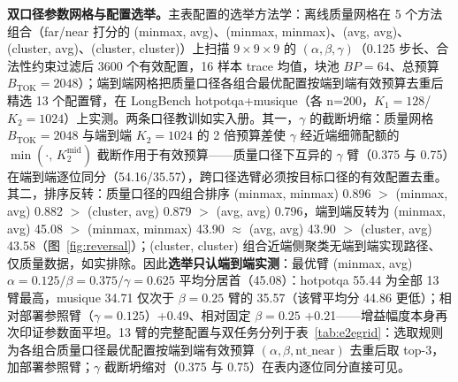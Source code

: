 \documentclass[11pt]{article}
\begin{document}
\textbf{双口径参数网格与配置选举。}主表配置的选举方法学：离线质量网格在 5 个方法组合（far/near 打分的 (minmax, avg)、(minmax, minmax)、(avg, avg)、(cluster, avg)、(cluster, cluster)）上扫描 $9\times9\times9$ 的 $(\alpha,\beta,\gamma)$（0.125 步长、合法性约束过滤后 3600 个有效配置，16 样本 trace 均值，块池 $BP{=}64$、总预算 $B_{\mathrm{TOK}}{=}2048$）；端到端网格把质量口径各组合最优配置按端到端有效预算去重后精选 13 个配置臂，在 LongBench hotpotqa+musique（各 n=200，$K_1{=}128$/$K_2{=}1024$）上实测。两条口径教训如实入册。其一，$\gamma$ 的截断坍缩：质量网格 $B_{\mathrm{TOK}}{=}2048$ 与端到端 $K_2{=}1024$ 的 2 倍预算差使 $\gamma$ 经近端细筛配额的 $\min(\cdot,\,K_2^{\mathrm{mid}})$ 截断作用于有效预算——质量口径下互异的 $\gamma$ 臂（0.375 与 0.75）在端到端逐位同分（54.16/35.57），跨口径选臂必须按目标口径的有效配置去重。其二，排序反转：质量口径的四组合排序 (minmax, minmax) 0.896 $>$ (minmax, avg) 0.882 $>$ (cluster, avg) 0.879 $>$ (avg, avg) 0.796，端到端反转为 (minmax, avg) 45.08 $>$ (minmax, minmax) 43.90 $\approx$ (avg, avg) 43.90 $>$ (cluster, avg) 43.58（图~\ref{fig:reversal}）；(cluster, cluster) 组合近端侧聚类无端到端实现路径、仅质量数据，如实排除。因此\textbf{选举只认端到端实测}：最优臂 (minmax, avg) $\alpha{=}0.125/\beta{=}0.375/\gamma{=}0.625$ 平均分居首（45.08）：hotpotqa 55.44 为全部 13 臂最高，musique 34.71 仅次于 $\beta{=}0.25$ 臂的 35.57（该臂平均分 44.86 更低）；相对部署参照臂（$\gamma{=}0.125$）+0.49、相对固定 $\beta{=}0.25$ +0.21——增益幅度本身再次印证参数面平坦。13 臂的完整配置与双任务分列于表~\ref{tab:e2egrid}：选取规则为各组合质量口径最优配置按端到端有效预算 $(\alpha,\beta,\mathrm{nt\_near})$ 去重后取 top-3，加部署参照臂；$\gamma$ 截断坍缩对（0.375 与 0.75）在表内逐位同分直接可见。
\end{document}

